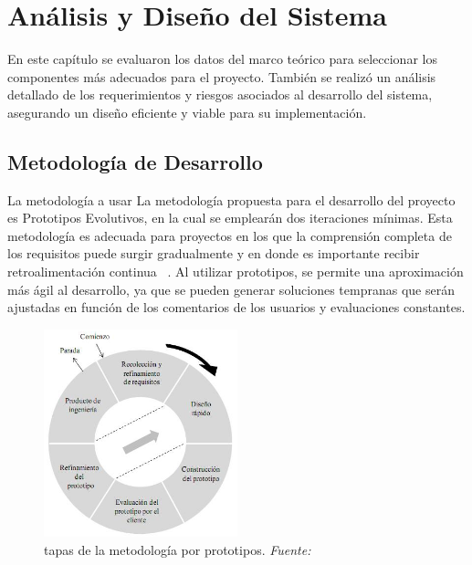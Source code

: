 \chapter{Análisis y Diseño del Sistema}\label{ch:Análisis y diseño del sistema}
En este capítulo se evaluaron los datos del marco teórico para seleccionar los componentes más adecuados para el proyecto. También se realizó un análisis detallado de los requerimientos y riesgos asociados al desarrollo del sistema, asegurando un diseño eficiente y viable para su implementación.

\section{Metodología de Desarrollo}
La metodología a usar	La metodología propuesta para el desarrollo del proyecto es Prototipos Evolutivos, en la cual se emplearán dos iteraciones mínimas. Esta metodología es adecuada para proyectos en los que la comprensión completa de los requisitos puede surgir gradualmente y en donde es importante recibir retroalimentación continua ~\cite{MetodologíasDeDesarrollo2015}. Al utilizar prototipos, se permite una aproximación más ágil al desarrollo, ya que se pueden generar soluciones tempranas que serán ajustadas en función de los comentarios de los usuarios y evaluaciones constantes.

\begin{figure}[H]
	\centering
	\includegraphics[width=0.5\textwidth]{img/chapter04/prototipo.png}
	\caption[Etapas de la metodología por prototipos.]{tapas de la metodología por prototipos. \textit{Fuente: ~\cite{MetodologíasDeDesarrollo2015}}}
	\label{fig:prototpios-metodología}  %
\end{figure}

